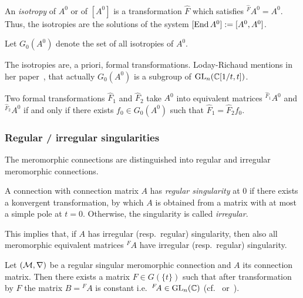 \begin{defn}\label{defn:isotropies}
  An \emph{isotropy} of $A^0$ or of $[A^0]$ is a transformation
  $\hat F$ which satisfies ${}^{\hat F}\!A^0=A^0$.
  Thus, the isotropies are the solutions of the system
  $[\operatorname{End} A^0]:=[A^0,A^0]$.

  Let $G_0(A^0)$ denote the set of all isotropies of $A^0$.
  \begin{s-rem}
    The isotropies are, a priori, formal transformations.
    Loday-Richaud mentions in her paper~\cite[853]{Loday1994}, that
    actually $G_0(A^0)$ is a subgroup of $\operatorname{GL}_n(\mathbb{C}[1/t,t])$.
  \end{s-rem}
\end{defn}
\begin{lem}
  Two formal transformations $\hat F_1$ and $\hat F_2$ take $A^0$ into
  equivalent matrices ${}^{\hat F_1}\!A^0$ and  ${}^{\hat F_2}\!A^0$ if and
  only if there exists $f_0\in G_0(A^0)$ such that $\hat F_1=\hat F_2f_0$.
\end{lem}
\begin{comment}
  \begin{proof}
    \TODO[Look at \cite{BJL1979Birkhoff}?]
  \end{proof}
\end{comment}

\subsubsection{Regular / irregular singularities}
The meromorphic connections are distinguished into regular and irregular
meromorphic connections.
\begin{defn}
  A connection with connection matrix $A$ has \emph{regular singularity} at $0$
  if there exists a konvergent transformation, by which $A$ is obtained from a
  matrix with at most a simple pole at $t=0$.
  Otherwise, the singularity is called \emph{irregular}.
  \begin{s-rem}
    This implies that, if $A$ has irregular (resp.\ regular) singularity, then
    also all meromorphic equivalent matrices ${}^{F}\!A$ have irregular
    (resp.\ regular) singularity.
  \end{s-rem}
\end{defn}
\begin{thm}
  Let $(\mathcal{M},\nabla)$ be a regular singular meromorphic connection and $A$ its
  connection matrix.
  Then there exists a matrix $F\in G(\!\{t\}\!)$ such that after transformation
  by $F$ the matrix $B={}^F\!A$ is constant i.e.\ ${}^F\!A\in\operatorname{GL}_n(\mathbb{C})$
  (cf.~\cite[Thm.II.2.8]{sabbah2007isomonodromic}
  or~\cite[Sec.5.1.2]{hotta2008}).
\end{thm}

